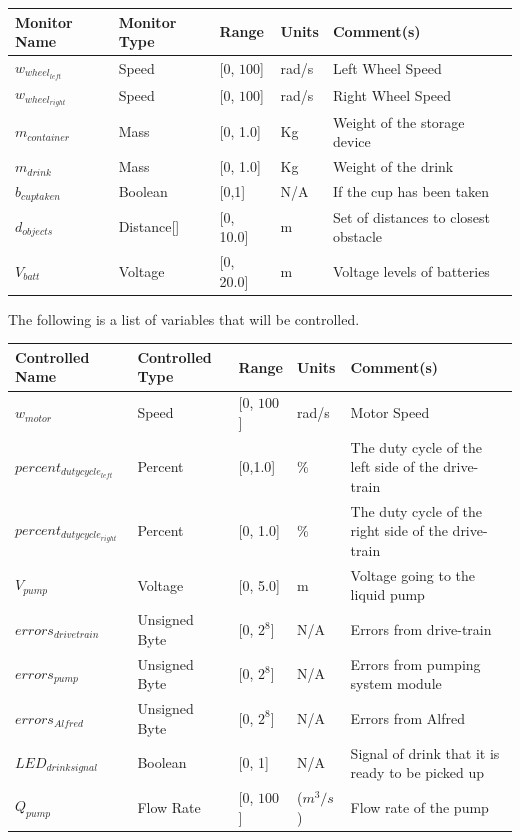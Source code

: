 \documentclass [10pt]{article}
\begin{document}
\begin{longtable}{|l|l|l|l|l|}\hline 
	\rowcolor{tableCell}\textbf{Monitor Name} & \textbf{Monitor Type} & \textbf{Range} & \textbf{Units} & \textbf{Comment(s)} \\ \hline
	$ w_{wheel_{left}} $ & Speed & [0, $ 100 $]& rad/s &  Left Wheel Speed\\ \hline
	\rowcolor{tableCell}$ w_{wheel_{right}} $ & Speed & [0, $ 100 $]& rad/s & Right Wheel Speed \\ \hline
	$ m_{container} $ & Mass & [0, 1.0]& Kg &  Weight of the storage device  \\ \hline
	\rowcolor{tableCell}$ m_{drink} $    & Mass & [0, 1.0] & Kg &  Weight of the drink  \\ \hline
	$ b_{cuptaken } $ & Boolean & [0,1] & N/A & If the cup has been taken \\ \hline
	\rowcolor{tableCell}$  d_{objects} $ & Distance[] & [0, 10.0]& m & Set of distances to closest obstacle \\ \hline
	$  V_{batt} $ & Voltage & [0, 20.0]& m &  Voltage levels of batteries \\ \hline
\end{longtable}


The following is a list of variables that will be controlled. \\

\begin{longtable}{|l|l|l|l|l|}\hline 
	\rowcolor{tableCell}\textbf{Controlled Name} & \textbf{Controlled Type} & \textbf{Range} & \textbf{Units} & \textbf{Comment(s)} \\ \hline
    $w_{motor}$ & Speed & [0, $ 100 $]& rad/s &  Motor Speed\\ \hline
    	\rowcolor{tableCell}$ percent_{dutycycle_{left}} $ & Percent & [0,1.0] & \% & The duty cycle of the left side of the drive-train \\ \hline
    $ percent_{dutycycle_{right}} $ & Percent & [0, 1.0]& \% & The duty cycle of the right side of the drive-train\\ \hline
   \rowcolor{tableCell} $  V_{pump} $ & Voltage & [0, 5.0]& m &  Voltage going to the liquid pump \\ \hline
	$ errors_{drivetrain} $ & Unsigned Byte & [0, $2^{8}$]& N/A & Errors from drive-train \\ \hline
	\rowcolor{tableCell}$  errors_{pump} $ & Unsigned Byte & [0, $2^{8}$]& N/A & Errors from pumping system module \\ \hline
	$  errors_{Alfred} $ & Unsigned Byte & [0, $2^{8}$]& N/A & Errors from Alfred \\ \hline
	\rowcolor{tableCell}$LED_{drinksignal}$ & Boolean & [0, 1]& N/A & Signal of drink that it is ready to be picked up \\ \hline
	$Q_{pump}$ & Flow Rate & [0, $ 100 $]& ($m^3/s$) &  Flow rate of the pump\\ \hline
\end{longtable}
\end{document}
